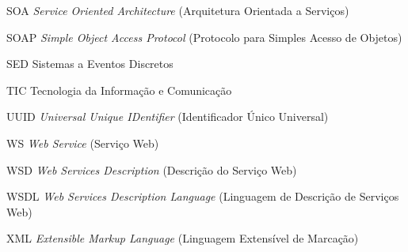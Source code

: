 \begin{siglas}
	\item[SOA] \textit{Service Oriented Architecture} (Arquitetura Orientada a Serviços)
	\item[SOAP] \textit{Simple Object Access Protocol} (Protocolo para Simples Acesso de Objetos)
	\item[SED] Sistemas a Eventos Discretos
	\item[TIC] Tecnologia da Informação e Comunicação
	\item[UUID] \textit{Universal Unique IDentifier} (Identificador Único Universal)
	\item[WS] \textit{Web Service} (Serviço Web)
	\item[WSD] \textit{Web Services Description} (Descrição do Serviço Web)
	\item[WSDL] \textit{Web Services Description Language} (Linguagem de Descrição de Serviços Web)
	\item[XML] \textit{Extensible Markup Language} (Linguagem Extensível de Marcação)
\end{siglas}

\tableofcontents*
\cleardoublepage
